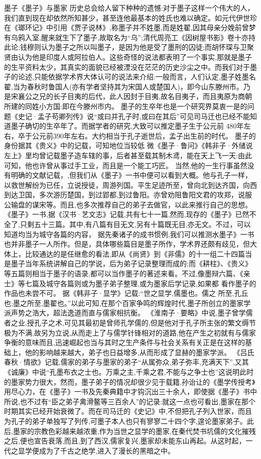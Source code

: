 \documentclass[12pt,UTF8]{ctexbook}
\begin{document}
墨子《墨子》与墨家
历史总会给人留下种种的遗憾:对于墨子这样一个伟大的人，我们直到现在却依然所知甚少，甚至连他最基本的姓氏也难以确定。如元代伊世珍在《瑯环记》中引用《贾子说林》,称墨子并不姓墨,而是姓翟,因其母亲分娩前曾梦有乌鸦入室,醒来就生下了墨子,故取名为“乌”;清代周亮工《因树屋书影》卷十亦持此论;钱穆则认为墨子之所以叫墨子，是因为他是受了墨刑的囚徒;而胡怀琛与卫聚贤由认为他是印度人或阿拉伯人。这些奇怪的说法都表明了一个事实,那就是墨子的生平资料太少，其真实的面貌已经被湮没在茫茫的历史沙尘之中。而我们对于墨子的论述,只能依据学术界大体认可的说法来介绍:一般而言，人们认定,墨子姓墨名翟,当为春秋时鲁国人(亦有学者坚持其为宋国人或楚国人)，即今山东滕州市。乃是宋襄公之兄的长子目夷的后代，此人因封于目夷,故名目夷子，而且夷原为商朝所建的同姓小方国:即在今滕州市内。
墨子的生卒年也是一个研究界莫衷一是的问题《史记·孟子苟卿列传》说“或曰并孔子时,或曰在其后”可见司马迁也已经不能知道墨子确切的生卒年了。而据学者的研究,大致可以推定墨子生于公元前 480年左右，卒于公元前390年左右。大约相当于孔子逝世后，孟子出生前的时代。
墨子的身份据其《贵义》中的记载，可知地位当较低
微《墨子·鲁问》《韩非子·外储说左上》里均曾记载墨子造车辖的事，后者甚至载其制木鸢，能在天上飞一天:由此可知，他也许曾从事过手工业，而且是一个能工巧匠。
当然,他的一生行事虽然没有明确的文献记载，,但我们从《墨子》一书中便可以看到大概。他与孔子一样，以救世解纷为已任，立说授徒，周游列国。平生足迹所至，曾向北到达齐国，向西到达卫国，多次游历楚国，到过郢都,到过鲁阳。亦曾劝阻鲁阳文君的攻郑，说服公输盘的谋宋等。而且,也多次推荐自己的弟子去做官，以此来推行自己的思想。
《墨子》一书,据《汉书·艺文志》记载,共有七十一篇,然而,现存的《墨子》已然不全了,只剩五十三篇。其中,有八篇有目无文,另有十篇既无目,亦无文。不过，可以知道均当为城守各篇的内容，
据先秦诸子的成书惯例,我们可以推测水墨子》一书也并非墨子一人所作。但是，具体哪些篇目是墨子所作，学术界还颇有歧见，但大体上，比较通达的是任继愈的看法,即从《尚贤》到《非儒》的十一组二十四篇当是墨子当年系统讲解自己的学说，后为弟子记录整理而成的;而《耕柱》、《贵义》等五篇则相当于墨子的语录,都可以当作墨子的著述来看。不过,像墨辩六篇、《亲士》等七篇及城守各篇则或为墨子弟子整理,或为墨家后学记录,如果都
看作墨子的作品也未尝不可。
据《韩非子·显学》记载:“世之显学,儒墨也。儒之
所至,孔丘也;墨之所至,墨翟也。”以此可知,在那个百家争鸣的辉煌时代,墨子所创立的墨家学派声势之浩大，超法逸道而直与儒家相抗衡。
《淮南子·要略》中说,墨子曾学儒者之业,授孔子之术,可见其最初是曾师孔学儒的,但是他对于孔子所主张的繁文缛节极为不满,故另为立说,从而走上了与儒学针锋相对的道路,他在产生之初就有与儒家争衡的意味而且,迅速崛起也当与其时之生产条件与社会关系有关正是在这样的基础上，他的影响越来越大，弟子也日益增多,从而形成了显赫的墨家学派。
《吕氏春秋·情欲》记载,儒家的弟子与墨家的弟子“从属弥众,弟子弥丰,充满天下”,又其《诚廉》中说“孔墨布衣之士也。万乘之主,千乘之君,不能与之争士也”这说明此时的墨家势力很大，然而，墨子弟子的情况却很少见于载籍,孙诒让的《墨学传授考》用尽心力，在《墨子》一书及先秦典籍中才钩沉出三十余人，即使据《墨子》书中所说,也不过有“臣之弟子禽滑鳌等三百余人”的记录:就这一点也可看出,墨家在那个时期其实已经开始衰微了。而在司马迁的《史记》中,不但把孔子列入世家，而且为孔子的弟子单独写了列传,可墨子本人也只有寥寥二十四个字,遑论墨家弟子。此后,墨家的宗教色彩越来越浓重,作为当世之显学的墨家,在秦代焚书坑儒的文化摧残之后,便也宣告衰落,而且,到了西汉,儒家复兴,墨家却未能东山再起。从这时起，一代之显学便成为了千古之绝学,进入了漫长的黑暗之中。
\end{document}
